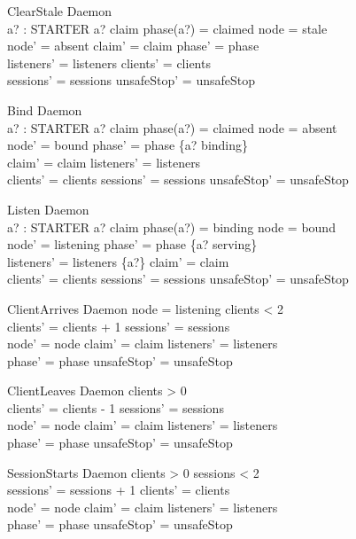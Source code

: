 \documentclass[a4paper,10pt]{article}
\begin{document}
\begin{schema}{ClearStale}
\Delta Daemon \\
a? : STARTER
\where
a? \in claim \land phase(a?) = claimed \land node = stale \\
node' = absent \land claim' = claim \land phase' = phase \\
listeners' = listeners \land clients' = clients \\
sessions' = sessions \land unsafeStop' = unsafeStop
\end{schema}
\begin{schema}{Bind}
\Delta Daemon \\
a? : STARTER
\where
a? \in claim \land phase(a?) = claimed \land node = absent \\
node' = bound \land phase' = phase \oplus \{a? \mapsto binding\} \\
claim' = claim \land listeners' = listeners \\
clients' = clients \land sessions' = sessions \land unsafeStop' = unsafeStop
\end{schema}
\begin{schema}{Listen}
\Delta Daemon \\
a? : STARTER
\where
a? \in claim \land phase(a?) = binding \land node = bound \\
node' = listening \land phase' = phase \oplus \{a? \mapsto serving\} \\
listeners' = listeners \cup \{a?\} \land claim' = claim \\
clients' = clients \land sessions' = sessions \land unsafeStop' = unsafeStop
\end{schema}
\begin{schema}{ClientArrives}
\Delta Daemon
\where
node = listening \land clients < 2 \\
clients' = clients + 1 \land sessions' = sessions \\
node' = node \land claim' = claim \land listeners' = listeners \\
phase' = phase \land unsafeStop' = unsafeStop
\end{schema}
\begin{schema}{ClientLeaves}
\Delta Daemon
\where
clients > 0 \\
clients' = clients - 1 \land sessions' = sessions \\
node' = node \land claim' = claim \land listeners' = listeners \\
phase' = phase \land unsafeStop' = unsafeStop
\end{schema}
\begin{schema}{SessionStarts}
\Delta Daemon
\where
clients > 0 \land sessions < 2 \\
sessions' = sessions + 1 \land clients' = clients \\
node' = node \land claim' = claim \land listeners' = listeners \\
phase' = phase \land unsafeStop' = unsafeStop
\end{schema}
\end{document}
